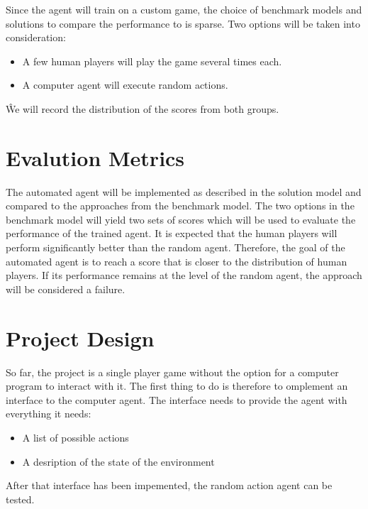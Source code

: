 \documentclass[a4paper,10pt]{article}
\begin{document}
Since the agent will train on a custom game, the choice of benchmark models and solutions to compare the performance to is sparse.
Two options will be taken into consideration:
\begin{itemize}
 \item A few human players will play the game several times each. 
 \item A computer agent will execute random actions.
\end{itemize}
Ŵe will record the distribution of the scores from both groups.


\section{Evalution Metrics}
% 
The automated agent will be implemented as described in the solution model and compared to the approaches from the benchmark model.
The two options in the benchmark model will yield two sets of scores which will be used to evaluate the performance of the trained agent.
It is expected that the human players will perform significantly better than the random agent.
Therefore, the goal of the automated agent is to reach a score that is closer to the distribution of human players.
If its performance remains at the level of the random agent, the approach will be considered a failure.
\section{Project Design}
% 
So far, the project is a single player game without the option for a computer program to interact with it.
The first thing to do is therefore to omplement an interface to the computer agent. 
The interface needs to provide the agent with everything it needs:
\begin{itemize}
 \item A list of possible actions 
 \item A desription of the state of the environment
\end{itemize}
After that interface has been impemented, the random action agent can be tested.
\end{document}
